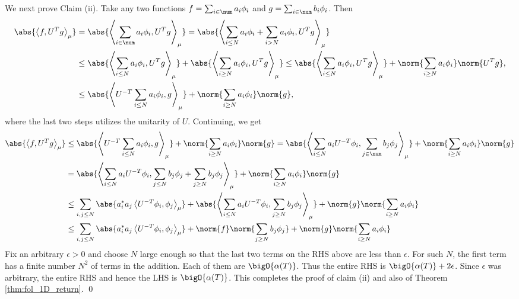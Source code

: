 \documentclass[12pt,oneside]{article}
\begin{document}
We next prove Claim (ii). Take any two functions $f = \sum_{i\in\num} a_i \phi_i$  and $g = \sum_{i\in\num} b_i \phi_i$. Then
%
\[\begin{split}
    \abs{ \left\langle f, U^T g \right\rangle_{\mu} } & = \abs{ \left\langle \sum_{i\in\num} a_i \phi_i, U^T g \right\rangle_{\mu} } = \abs{ \left\langle \sum_{i\leq N} a_i \phi_i + \sum_{i>N} a_i \phi_i, U^T g \right\rangle_{\mu} } \\
    &\leq \abs{ \left\langle \sum_{i\leq N} a_i \phi_i , U^T g \right\rangle_{\mu} } + \abs{ \left\langle \sum_{i\geq N} a_i \phi_i , U^T g \right\rangle_{\mu} } \leq \abs{ \left\langle \sum_{i\leq N} a_i \phi_i , U^T g \right\rangle_{\mu} } + \norm{ \sum_{i\geq N} a_i \phi_i } \norm{U^T g} ,\\
    &\leq \abs{  \left\langle U^{-T} \sum_{i\leq N} a_i \phi_i , g \right\rangle_{\mu} } + \norm{ \sum_{i\geq N} a_i \phi_i } \norm{g} ,
\end{split}\]
where the last two steps utilizes the unitarity of $U$. Continuing, we get
%
\[\begin{split}
    \abs{ \left\langle f, U^T g \right\rangle_{\mu} } &\leq \abs{  \left\langle U^{-T} \sum_{i\leq N} a_i \phi_i , g \right\rangle_{\mu} } + \norm{ \sum_{i\geq N} a_i \phi_i } \norm{g} = \abs{  \left\langle  \sum_{i\leq N} a_i U^{-T} \phi_i , \sum_{j\in\num} b_j \phi_j \right\rangle_{\mu} } + \norm{ \sum_{i\geq N} a_i \phi_i } \norm{g} \\
    &= \abs{  \left\langle  \sum_{i\leq N} a_i U^{-T} \phi_i , \sum_{j\leq N} b_j \phi_j + \sum_{j\geq N} b_j \phi_j \right\rangle_{\mu} } + \norm{ \sum_{i\geq N} a_i \phi_i } \norm{g} \\
    &\leq \sum_{i,j\leq N} \abs{ a_i^* a_j  \left\langle U^{-T} \phi_i, \phi_j \right\rangle_{\mu} } + \abs{  \left\langle  \sum_{i\leq N} a_i U^{-T} \phi_i ,  \sum_{j\geq N} b_j \phi_j \right\rangle_{\mu} } + \norm{g} \norm{ \sum_{i\geq N} a_i \phi_i } \\
    &\leq \sum_{i,j\leq N} \abs{ a_i^* a_j  \left\langle U^{-T} \phi_i, \phi_j \right\rangle_{\mu} } + \norm{f} \norm{    \sum_{j\geq N} b_j \phi_j } + \norm{g} \norm{ \sum_{i\geq N} a_i \phi_i }
\end{split}\]
%
Fix an arbitrary $\epsilon>0$ and choose $N$ large enough so that the last two terms on the RHS above are less than $\epsilon$. For such $N$, the first term has a finite number $N^2$ of terms in the addition. Each of them are $\bigO{ \alpha(T) }$. Thus the entire RHS is $\bigO{ \alpha(T) } + 2\epsilon$. Since $\epsilon$ was arbitrary, the entire RHS and hence the LHS is $\bigO{ \alpha(T) }$. This completes the proof of claim (ii) and also of Theorem \ref{thm:fol_1D_return}. \qed
\end{document}

